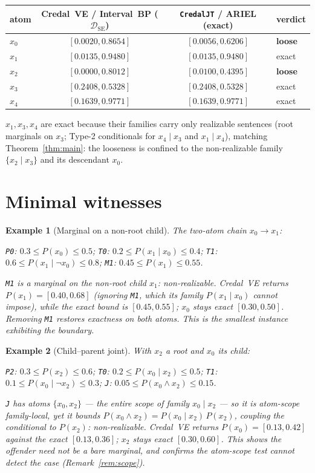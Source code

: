 \documentclass[11pt]{article}
\newtheorem{example}{Example}
\newcommand{\DSE}{\mathcal{D}_{\mathrm{SE}}}
\begin{document}
\begin{center}\small
\begin{tabular}{lccl}
\toprule
atom & Credal~VE / Interval~BP ($\DSE$) & \texttt{CredalJT} / ARIEL (exact) & verdict \\
\midrule
$x_0$ & $[0.0020,0.8654]$ & $[0.0056,0.6206]$ & \textbf{loose} \\
$x_1$ & $[0.0135,0.9480]$ & $[0.0135,0.9480]$ & exact \\
$x_2$ & $[0.0000,0.8012]$ & $[0.0100,0.4395]$ & \textbf{loose} \\
$x_3$ & $[0.2408,0.5328]$ & $[0.2408,0.5328]$ & exact \\
$x_4$ & $[0.1639,0.9771]$ & $[0.1639,0.9771]$ & exact \\
\bottomrule
\end{tabular}
\end{center}
$x_1,x_3,x_4$ are exact because their families carry only realizable sentences (root marginals on
$x_3$; Type-2 conditionals for $x_4\mid x_3$ and $x_1\mid x_4$), matching Theorem~\ref{thm:main}: the
looseness is confined to the non-realizable family $\{x_2\mid x_3\}$ and its descendant $x_0$.

\section{Minimal witnesses}\label{sec:witnesses}

\begin{example}[Marginal on a non-root child]\label{ex:2node}
The two-atom chain $x_0\!\to\!x_1$:
\begin{center}\small
\texttt{P0}: $0.3\le P(x_0)\le0.5$;\quad
\texttt{T0}: $0.2\le P(x_1\mid x_0)\le0.4$;\quad
\texttt{T1}: $0.6\le P(x_1\mid\lnot x_0)\le0.8$;\quad
\texttt{M1}: $0.45\le P(x_1)\le0.55$.
\end{center}
\texttt{M1} is a marginal on the non-root child $x_1$: non-realizable. Credal~VE returns
$P(x_1)=[0.40,0.68]$ (ignoring \texttt{M1}, which its family $P(x_1\mid x_0)$ cannot impose), while the
exact bound is $[0.45,0.55]$; $x_0$ stays exact $[0.30,0.50]$. Removing \texttt{M1} restores exactness
on both atoms. This is the smallest instance exhibiting the boundary.
\end{example}

\begin{example}[Child--parent joint]\label{ex:joint}
With $x_2$ a root and $x_0$ its child:
\begin{center}\small
\texttt{P2}: $0.3\le P(x_2)\le0.6$;\quad
\texttt{T0}: $0.2\le P(x_0\mid x_2)\le0.5$;\quad
\texttt{T1}: $0.1\le P(x_0\mid\lnot x_2)\le0.3$;\quad
\texttt{J}: $0.05\le P(x_0\wedge x_2)\le0.15$.
\end{center}
\texttt{J} has atoms $\{x_0,x_2\}$ --- the entire scope of family $x_0\mid x_2$ --- so it is atom-scope
family-local, yet it bounds $P(x_0\wedge x_2)=P(x_0\mid x_2)\,P(x_2)$, coupling the conditional to
$P(x_2)$: non-realizable. Credal~VE returns $P(x_0)=[0.13,0.42]$ against the exact $[0.13,0.36]$; $x_2$
stays exact $[0.30,0.60]$. This shows the offender need not be a bare marginal, and confirms the atom-scope test cannot detect the case (Remark~\ref{rem:scope}).
\end{example}
\end{document}
